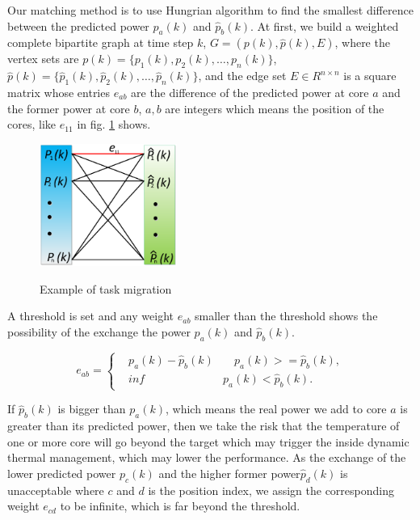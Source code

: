 Our matching method is to use Hungrian algorithm to find the smallest difference between the predicted power $p_a(k)$ and $\hat{p}_{b}(k)$. 
At first, we build a weighted complete bipartite graph at time step $k$, $G=(p(k),\hat{p}(k),E)$, where the vertex sets are $p(k)=\{p_1(k),p_2(k), \dotsc ,p_n(k)\}$,$\hat{p}(k)=\{\hat{p}_{1}(k),\hat{p}_{2}(k), \dotsc ,\hat{p}_{n}(k)\}$, and the edge set $E \in R^{n\times n}$ is a square matrix whose entries $e_{ab}$ are the difference of the predicted power at core $a$ and the former power at core $b$, $a,b$ are integers which means the position of the cores, like $e_{11}$ in fig. \ref{wei} shows.


\begin{figure}
  \centering
     {
       \includegraphics[width=0.4\textwidth]{fig/wei}
     }
     \caption{Example of task migration}\label{wei}
\end{figure}


 A threshold is set and any weight $e_{ab}$ smaller than the threshold shows the possibility of the exchange the power $p_a(k)$ and $\hat{p}_{b}(k)$.


\begin{equation}
\label{w}
e_{ab}=\left\{
\begin{aligned}
&  p_a(k)-\hat{p}_{b}(k)  &\quad p_a(k) >= \hat{p}_{b}(k),\\
& inf  &p_a(k) < \hat{p}_{b}(k).
\end{aligned}
\right.
\end{equation}


If $\hat{p}_{b}(k)$ is bigger than $p_a(k)$, which means the real power we add to core $a$ is greater than its predicted power, then we take the risk that the temperature of one or more core will go beyond the target which may trigger the inside dynamic thermal management, which may lower the performance.
As the exchange of the lower predicted power $p_c(k)$ and the higher former power$\hat{p}_{d}(k)$ is unacceptable where $c$ and $d$ is the position index, we assign the corresponding weight $e_{cd}$ to be infinite, which is far beyond the threshold.


